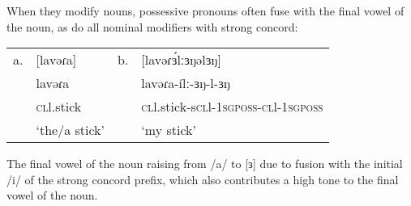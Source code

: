 When they modify nouns, possessive pronouns often fuse with the final vowel of the noun, as do all nominal modifiers with strong concord:

\ea
\begin{tabular}[t]{llll}
a. & [lavəɾa]  		& b. & 	[lavəɾɜ́lːɜŋəlɜŋ]\\
	& lavəɾa 	  	&	& lavəɾa-ílː-ɜŋ-l-ɜŋ\\
	& \textsc{cl}l.stick 	& 	& 	\textsc{cl}l.stick-s\textsc{cl}l-1\textsc{sgposs}-\textsc{cl}l-1\textsc{sgposs}\\
	& ‘the/a stick’ & 	&	‘my stick’	\\
\end{tabular}
\z 

The final vowel of the noun raising from /a/ to [ɜ] due to fusion with the initial /i/ of the strong concord prefix, which also contributes a high tone to the final vowel of the noun.

%
%

